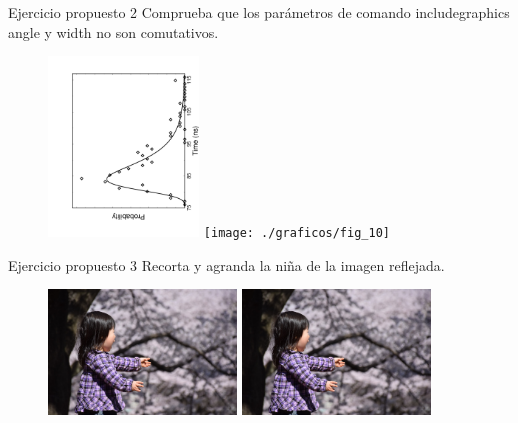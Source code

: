\documentclass{beamer}
\begin{document}
\begin{frame}[fragile]
\begin{exampleblock}{Ejercicio propuesto 2}
Comprueba que los par\'ametros de comando includegraphics angle y width no son comutativos.
\end{exampleblock}
\begin{figure}
\includegraphics[angle=270,width=4cm]{./graficos/fig_9}
\hspace{0.5cm}
\texttt{[image: ./graficos/fig\_10]}
\end{figure}

\end{frame}


\begin{frame}[fragile]
\begin{exampleblock}{Ejercicio propuesto 3}
Recorta  y agranda  la niña de la imagen reflejada.
\end{exampleblock}
\begin{figure}
\includegraphics[width=5cm]{./graficos/sorpresa}
\hspace{0.5cm}
\includegraphics[trim = 50mm 0mm 190mm 40mm, clip,width=5cm]{./graficos/sorpresa}
\end{figure}


\end{frame}
\end{document}
